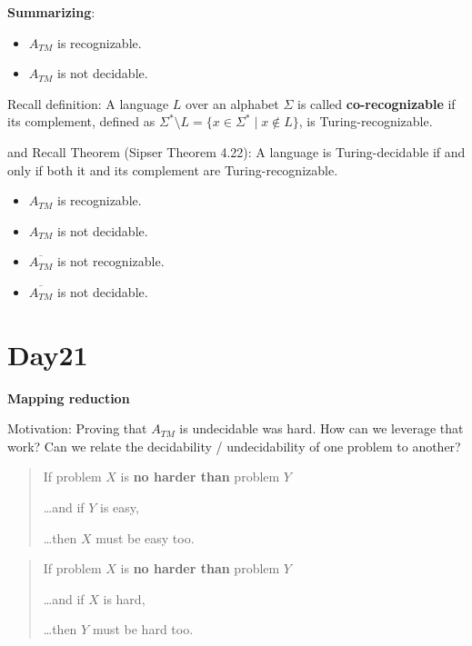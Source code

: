 \documentclass[12pt, oneside]{article}
\begin{document}
\vfill


\newpage

{\bf Summarizing}: 

\begin{itemize}
    \item $A_{TM}$  is recognizable.
    \item $A_{TM}$  is  not  decidable.
\end{itemize}

\vfill

Recall definition: A language $L$ over an  alphabet $\Sigma$ is called {\bf co-recognizable} if its complement,  defined
as $\Sigma^* \setminus L  = \{ x  \in  \Sigma^* \mid x \notin  L \}$, is Turing-recognizable.

and Recall  Theorem (Sipser Theorem 4.22): A  language is Turing-decidable if and only if both  it and its complement
are Turing-recognizable.

\vfill

\begin{itemize}
    \item $A_{TM}$  is recognizable.
    \item $A_{TM}$  is  not  decidable.
    \item $\overline{A_{TM}}$   is  not  recognizable.
    \item $\overline{A_{TM}}$   is  not  decidable.
\end{itemize}

\vfill \vfill
\section*{Day21}


{\bf Mapping reduction}

Motivation: Proving that $A_{TM}$ is undecidable was hard. How can we leverage that work? 
Can we relate the decidability / undecidability of one problem to another?

\begin{quote}
If problem $X$ is {\bf no harder than} problem $Y$

\ldots and if $Y$ is easy,

\ldots then $X$ must be easy too.
\end{quote}


\begin{quote}
    If problem $X$ is {\bf no harder than} problem $Y$
    
    \ldots and if $X$ is hard,
    
    \ldots then $Y$ must be hard too.
\end{quote}
\end{document}
